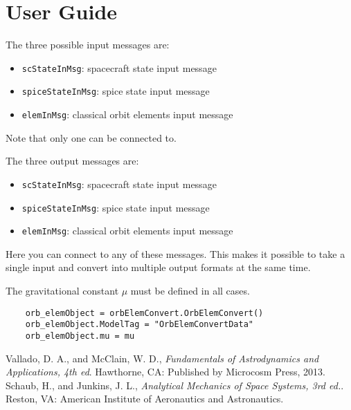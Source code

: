 \section{User Guide}
The three possible input messages are:
\begin{itemize}
	\item {\tt scStateInMsg}: spacecraft state input message
	\item {\tt spiceStateInMsg}: spice state input message
	\item {\tt elemInMsg}: classical orbit elements input message
\end{itemize}
Note that only one can be connected to.  

The three output messages are:
\begin{itemize}
	\item {\tt scStateInMsg}: spacecraft state input message
	\item {\tt spiceStateInMsg}: spice state input message
	\item {\tt elemInMsg}: classical orbit elements input message
\end{itemize}
Here you can connect to any of these messages.  This makes it possible to take a single input and convert into multiple output formats at the same time.

The gravitational constant $\mu$ must be defined in all cases.
\begin{verbatim}
	orb_elemObject = orbElemConvert.OrbElemConvert()
	orb_elemObject.ModelTag = "OrbElemConvertData"
	orb_elemObject.mu = mu
\end{verbatim}


\begin{thebibliography}{1}
	Vallado, D. A., and McClain, W. D., \textit{Fundamentals of Astrodynamics and Applications, 4th ed}. Hawthorne, CA: Published by Microcosm Press, 2013.
	Schaub, H., and Junkins, J. L., \textit{Analytical Mechanics of Space Systems, 3rd ed.}. Reston, VA: American Institute of Aeronautics and Astronautics.
\end{thebibliography}
